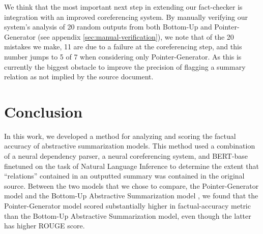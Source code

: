 \documentclass{article}
\begin{document}
We think that the most important next step in extending our fact-checker is integration with an improved coreferencing system. By manually verifying our system's analysis of 20 random outputs from both Bottom-Up and Pointer-Generator (see appendix \ref{sec:manual-verification}), we note that of the 20 mistakes we make, 11 are due to a failure at the coreferencing step, and this number jumps to 5 of 7 when considering only Pointer-Generator. As this is currently the biggest obstacle to improve the precision of flagging a summary relation as not implied by the source document.

\section{Conclusion}

In this work, we developed a method for analyzing and scoring the factual accuracy of abstractive summarization models. This method used a combination of a neural dependency parser, a neural coreferencing system, and BERT-base finetuned on the task of Natural Language Inference to determine the extent that ``relations'' contained in an outputted summary was contained in the original source. Between the two models that we chose to compare, the Pointer-Generator model \cite{see2017get} and the Bottom-Up Abstractive Summarization model \cite{gehrmann2018bottom}, we found that the Pointer-Generator model scored substantially higher in factual-accuracy metric than the Bottom-Up Abstractive Summarization model, even though the latter has higher ROUGE score.



\end{document}
